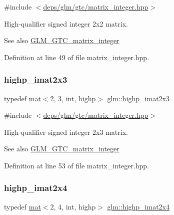 {\ttfamily \#include $<$\hyperlink{matrix__integer_8hpp}{deps/glm/gtc/matrix\+\_\+integer.\+hpp}$>$}

High-\/qualifier signed integer 2x2 matrix. \begin{DoxySeeAlso}{See also}
\hyperlink{group__gtc__matrix__integer}{G\+L\+M\+\_\+\+G\+T\+C\+\_\+matrix\+\_\+integer} 
\end{DoxySeeAlso}


Definition at line 49 of file matrix\+\_\+integer.\+hpp.

\mbox{\label{group__gtc__matrix__integer_ga6bf015d7d01115e1d71362f2aa1cd3c4}} 
\subsubsection{\texorpdfstring{highp\+\_\+imat2x3}{highp\_imat2x3}}
{\footnotesize\ttfamily typedef \hyperlink{structglm_1_1mat}{mat}$<$2, 3, int, highp$>$ \hyperlink{group__gtc__matrix__integer_ga6bf015d7d01115e1d71362f2aa1cd3c4}{glm\+::highp\+\_\+imat2x3}}



{\ttfamily \#include $<$\hyperlink{matrix__integer_8hpp}{deps/glm/gtc/matrix\+\_\+integer.\+hpp}$>$}

High-\/qualifier signed integer 2x3 matrix. \begin{DoxySeeAlso}{See also}
\hyperlink{group__gtc__matrix__integer}{G\+L\+M\+\_\+\+G\+T\+C\+\_\+matrix\+\_\+integer} 
\end{DoxySeeAlso}


Definition at line 53 of file matrix\+\_\+integer.\+hpp.

\mbox{\label{group__gtc__matrix__integer_ga5e3a9d05895fbefef19c051e60ca81c4}} 
\subsubsection{\texorpdfstring{highp\+\_\+imat2x4}{highp\_imat2x4}}
{\footnotesize\ttfamily typedef \hyperlink{structglm_1_1mat}{mat}$<$2, 4, int, highp$>$ \hyperlink{group__gtc__matrix__integer_ga5e3a9d05895fbefef19c051e60ca81c4}{glm\+::highp\+\_\+imat2x4}}



